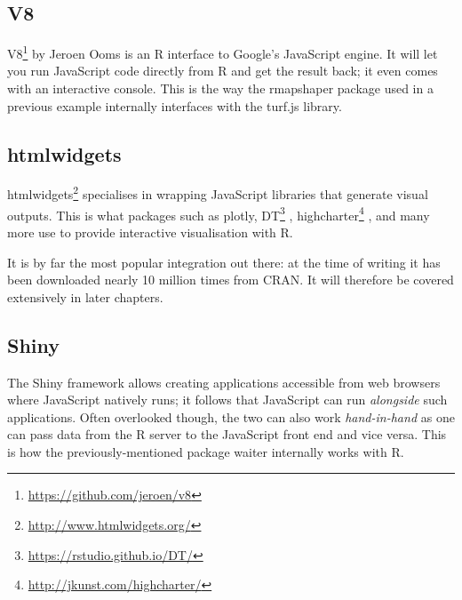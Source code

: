 \documentclass[10pt,]{krantz}
\makeatletter
\newenvironment{Shaded}{\begin{snugshade}}{\end{snugshade}}
\newcommand{\CommentTok}[1]{\textcolor[rgb]{0.37,0.37,0.37}{\textit{#1}}}
\newcommand{\KeywordTok}[1]{\textcolor[rgb]{0.27,0.27,0.27}{\textbf{#1}}}
\newcommand{\NormalTok}[1]{#1}
\newcommand{\OperatorTok}[1]{\textcolor[rgb]{0.43,0.43,0.43}{\textbf{#1}}}
\newcommand{\StringTok}[1]{\textcolor[rgb]{0.5,0.5,0.5}{#1}}
\renewcommand{\href}[2]{#2\footnote{\url{#1}}}
\newenvironment{kframe}{%
\medskip{}
\setlength{\fboxsep}{.8em}
 \def\at@end@of@kframe{}%
 \ifinner\ifhmode%
  \def\at@end@of@kframe{\end{minipage}}%
  \begin{minipage}{\columnwidth}%
 \fi\fi%
 \def\FrameCommand##1{\hskip\@totalleftmargin \hskip-\fboxsep
 \colorbox{shadecolor}{##1}\hskip-\fboxsep
     \hskip-\linewidth \hskip-\@totalleftmargin \hskip\columnwidth}%
 \MakeFramed {\advance\hsize-\width
   \@totalleftmargin\z@ \linewidth\hsize
   \@setminipage}}%
 {\par\unskip\endMakeFramed%
 \at@end@of@kframe}
\renewenvironment{Shaded}{\begin{kframe}}{\end{kframe}}
\makeatother
\begin{document}
\hypertarget{intro-v8}{%
\subsection{V8}\label{intro-v8}}

\href{https://github.com/jeroen/v8}{V8} by Jeroen Ooms is an R interface to Google's JavaScript engine. It will let you run JavaScript code directly from R and get the result back; it even comes with an interactive console. This is the way the rmapshaper package used in a previous example internally interfaces with the turf.js library.

\begin{Shaded}
\end{Shaded}

\hypertarget{intro-htmlwidgets}{%
\subsection{htmlwidgets}\label{intro-htmlwidgets}}

\href{http://www.htmlwidgets.org/}{htmlwidgets} \citep{R-htmlwidgets} specialises in wrapping JavaScript libraries that generate visual outputs. This is what packages such as plotly, \href{https://rstudio.github.io/DT/}{DT} \citep{R-DT}, \href{http://jkunst.com/highcharter/}{highcharter} \citep{R-highcharter}, and many more use to provide interactive visualisation with R.

It is by far the most popular integration out there: at the time of writing it has been downloaded nearly 10 million times from CRAN. It will therefore be covered extensively in later chapters.

\hypertarget{intro-shiny}{%
\subsection{Shiny}\label{intro-shiny}}

The Shiny framework allows creating applications accessible from web browsers where JavaScript natively runs; it follows that JavaScript can run \emph{alongside} such applications. Often overlooked though, the two can also work \emph{hand-in-hand} as one can pass data from the R server to the JavaScript front end and vice versa. This is how the previously-mentioned package waiter internally works with R.
\end{document}
